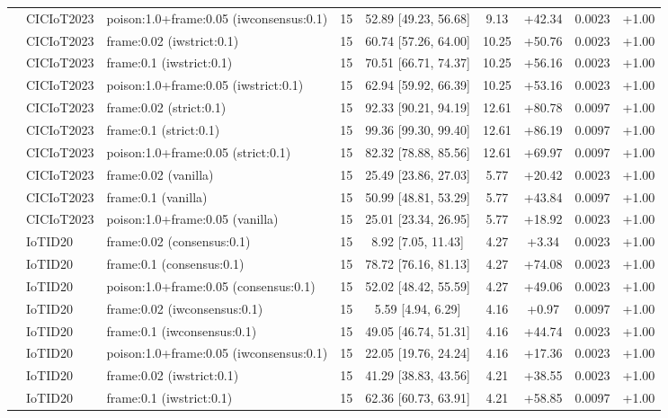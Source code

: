 \begin{table}[t]
\begin{tabular}{lllcccccc}
 & CICIoT2023 & poison:1.0+frame:0.05 (iwconsensus:0.1) & 15 & 52.89 [49.23, 56.68] & 9.13 & +42.34 & 0.0023 & +1.00 \\
 & CICIoT2023 & frame:0.02 (iwstrict:0.1) & 15 & 60.74 [57.26, 64.00] & 10.25 & +50.76 & 0.0023 & +1.00 \\
 & CICIoT2023 & frame:0.1 (iwstrict:0.1) & 15 & 70.51 [66.71, 74.37] & 10.25 & +56.16 & 0.0023 & +1.00 \\
 & CICIoT2023 & poison:1.0+frame:0.05 (iwstrict:0.1) & 15 & 62.94 [59.92, 66.39] & 10.25 & +53.16 & 0.0023 & +1.00 \\
 & CICIoT2023 & frame:0.02 (strict:0.1) & 15 & 92.33 [90.21, 94.19] & 12.61 & +80.78 & 0.0097 & +1.00 \\
 & CICIoT2023 & frame:0.1 (strict:0.1) & 15 & 99.36 [99.30, 99.40] & 12.61 & +86.19 & 0.0097 & +1.00 \\
 & CICIoT2023 & poison:1.0+frame:0.05 (strict:0.1) & 15 & 82.32 [78.88, 85.56] & 12.61 & +69.97 & 0.0097 & +1.00 \\
 & CICIoT2023 & frame:0.02 (vanilla) & 15 & 25.49 [23.86, 27.03] & 5.77 & +20.42 & 0.0023 & +1.00 \\
 & CICIoT2023 & frame:0.1 (vanilla) & 15 & 50.99 [48.81, 53.29] & 5.77 & +43.84 & 0.0097 & +1.00 \\
 & CICIoT2023 & poison:1.0+frame:0.05 (vanilla) & 15 & 25.01 [23.34, 26.95] & 5.77 & +18.92 & 0.0023 & +1.00 \\
 & IoTID20 & frame:0.02 (consensus:0.1) & 15 & 8.92 [7.05, 11.43] & 4.27 & +3.34 & 0.0023 & +1.00 \\
 & IoTID20 & frame:0.1 (consensus:0.1) & 15 & 78.72 [76.16, 81.13] & 4.27 & +74.08 & 0.0023 & +1.00 \\
 & IoTID20 & poison:1.0+frame:0.05 (consensus:0.1) & 15 & 52.02 [48.42, 55.59] & 4.27 & +49.06 & 0.0023 & +1.00 \\
 & IoTID20 & frame:0.02 (iwconsensus:0.1) & 15 & 5.59 [4.94, 6.29] & 4.16 & +0.97 & 0.0097 & +1.00 \\
 & IoTID20 & frame:0.1 (iwconsensus:0.1) & 15 & 49.05 [46.74, 51.31] & 4.16 & +44.74 & 0.0023 & +1.00 \\
 & IoTID20 & poison:1.0+frame:0.05 (iwconsensus:0.1) & 15 & 22.05 [19.76, 24.24] & 4.16 & +17.36 & 0.0023 & +1.00 \\
 & IoTID20 & frame:0.02 (iwstrict:0.1) & 15 & 41.29 [38.83, 43.56] & 4.21 & +38.55 & 0.0023 & +1.00 \\
 & IoTID20 & frame:0.1 (iwstrict:0.1) & 15 & 62.36 [60.73, 63.91] & 4.21 & +58.85 & 0.0097 & +1.00 \\

\end{tabular}
\end{table}
